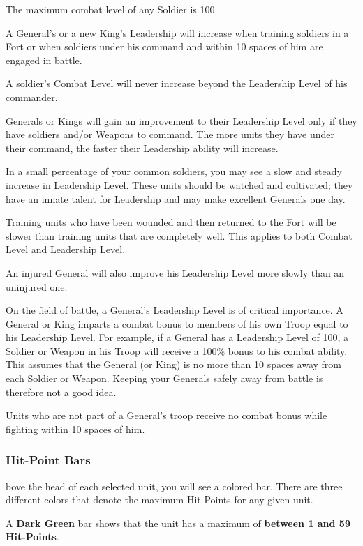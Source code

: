 The maximum combat level of any Soldier is 100.

A General’s or a new King’s Leadership will increase when training soldiers in a Fort or when soldiers under his command and within 10 spaces of him are engaged in battle.

A soldier’s Combat Level will never increase beyond the Leadership Level of his commander.

Generals or Kings will gain an improvement to their Leadership Level only if they have soldiers and/or Weapons to command. The more units they have under their command, the faster their Leadership ability will increase.

In a small percentage of your common soldiers, you may see a slow and steady increase in Leadership Level. These units should be watched and cultivated; they have an innate talent for Leadership and may make excellent Generals one day.

Training units who have been wounded and then returned to the Fort will be slower than training units that are completely well. This applies to both Combat Level and Leadership Level.

An injured General will also improve his Leadership Level more slowly than an uninjured one.

On the field of battle, a General’s Leadership Level is of critical importance. A General or King imparts a combat bonus to members of his own Troop equal to his Leadership Level. For example, if a General has a Leadership Level of 100, a Soldier or Weapon in his Troop will receive a 100\% bonus to his combat ability. This assumes that the General (or King) is no more than 10 spaces away from each Soldier or Weapon. Keeping your Generals safely away from battle is therefore not a good idea.

Units who are not part of a General’s troop receive no combat bonus while fighting within 10 spaces of him.

\subsubsection{Hit-Point Bars}


bove the head of each selected unit, you will see a colored bar. There are three different colors that denote the maximum Hit-Points for any given unit.

A \textbf{Dark Green} bar shows that the unit has a maximum of \textbf{between 1
  and 59 Hit-Points}.

